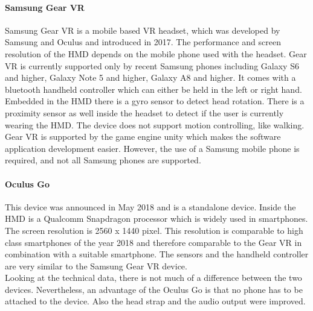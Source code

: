 \paragraph{Samsung Gear VR} Samsung Gear VR is a mobile based VR headset, which was developed by Samsung and Oculus and introduced in 2017. The performance and screen resolution of the HMD depends on the mobile phone used with the headset. Gear VR is currently supported only by recent Samsung phones including Galaxy S6 and higher, Galaxy Note 5 and higher, Galaxy A8 and higher.
It comes with a bluetooth handheld controller which can either be held in the left or right hand. Embedded in the HMD there is a gyro sensor to detect head rotation. There is a proximity sensor as well inside the headset to detect if the user is currently wearing the HMD. The device does not support motion controlling, like walking. \cite{Samsung.2019}\\
Gear VR is supported by the game engine unity which makes the software application development easier. However, the use of a Samsung mobile phone is required, and not all Samsung phones are supported.
\paragraph{Oculus Go}
This device was announced in May 2018 and is a standalone device.
Inside the HMD is a Qualcomm Snapdragon processor which is widely used in smartphones. The screen resolution is  2560 x 1440 pixel. This resolution is comparable to high class smartphones of the year 2018 and therefore comparable to the Gear VR in combination with a suitable smartphone. The sensors and the handheld controller are very similar to the Samsung Gear VR device.\\
Looking at the technical data, there is not much of a difference between the two devices. Nevertheless, an advantage of the Oculus Go is that no phone has to be attached to the device. Also the head strap and the audio output were improved.\cite{Robertson.2018}
